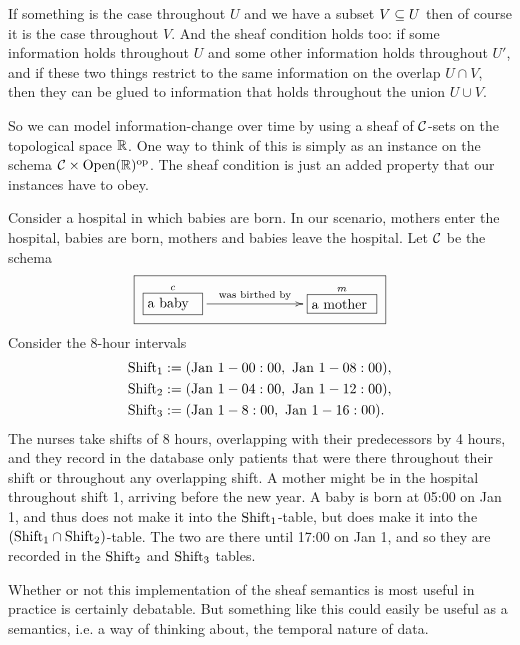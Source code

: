 \documentclass[CT4S-EN-RU]{subfiles}
\begin{document}
\begin{blockENG}
If something is the case throughout $U$ and we have a subset $V\ss U$ then of course it is the case throughout $V$. And the sheaf condition holds too: if some information holds throughout $U$ and some other information holds throughout $U'$, and if these two things restrict to the same information on the overlap $U\cap V$, then they can be glued to information that holds throughout the union $U\cup V$.
\end{blockENG}

\begin{blockRUS}
\end{blockRUS}

\begin{blockENG}
So we can model information-change over time by using a sheaf of $\mcC$-sets on the topological space $\RR$. One way to think of this is simply as an instance on the schema $\mcC\times\Op(\RR)\op$. The sheaf condition is just an added property that our instances have to obey.
\end{blockENG}

\begin{blockRUS}
\end{blockRUS}

\begin{exampleENG}
Consider a hospital in which babies are born. In our scenario, mothers enter the hospital, babies are born, mothers and babies leave the hospital. Let $\mcC$ be the schema 
$$\fbox{\xymatrix{\obox{c}{.5in}{a baby}\LA{rr}{was birthed by}&\hspace{.2in}&\obox{m}{.6in}{a mother}}}$$
Consider the 8-hour intervals 
\begin{align*}
\tn{Shift}_1&:=(\tn{Jan }1 - 00:00,\tn{ Jan }1 - 08:00),\\
\tn{Shift}_2&:=(\tn{Jan }1 - 04:00,\tn{ Jan }1 - 12:00),\\
\tn{Shift}_3&:=(\tn{Jan }1 - 8:00,\tn{ Jan }1 - 16:00).
\end{align*}
The nurses take shifts of 8 hours, overlapping with their predecessors by 4 hours, and they record in the database only patients that were there throughout their shift or throughout any overlapping shift. A mother might be in the hospital throughout shift 1, arriving before the new year. A baby is born at 05:00 on Jan 1, and thus does not make it into the $\tn{Shift}_1$-table, but does make it into the $(\tn{Shift}_1\cap\tn{Shift}_2)$-table. The two are there until 17:00 on Jan 1, and so they are recorded in the $\tn{Shift}_2$ and $\tn{Shift}_3$ tables. 
\end{exampleENG}

\begin{exampleRUS}
\end{exampleRUS}

\begin{blockENG}
Whether or not this implementation of the sheaf semantics is most useful in practice is certainly debatable. But something like this could easily be useful as a semantics, i.e. a way of thinking about, the temporal nature of data.
\end{blockENG}

\begin{blockRUS}
\end{blockRUS}
\end{document}
